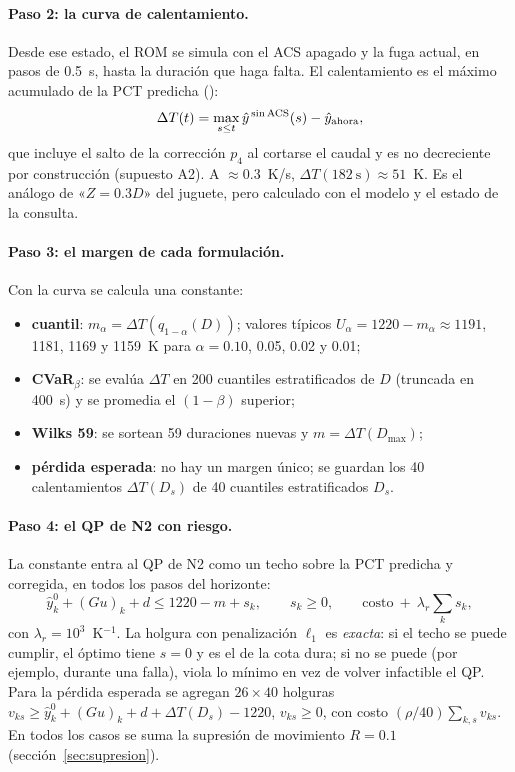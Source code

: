 \paragraph{Paso 2: la curva de calentamiento.} Desde ese estado, el ROM se simula con el ACS
apagado y la fuga actual, en pasos de 0.5~s, hasta la duración que haga falta. El calentamiento
es el máximo acumulado de la PCT predicha ():
\[
\Delta T(t)=\max_{s\le t}\hat y^{\,\rm sin\,ACS}(s)-\hat y_{\rm ahora},
\]
que incluye el salto de la corrección $p_4$ al cortarse el caudal y es no decreciente por
construcción (supuesto A2). A $\approx0.3$~K/s, $\Delta T(182~\text{s})\approx51$~K. Es el
análogo de «$Z=0.3D$» del juguete, pero calculado con el modelo y el estado de la consulta.

\paragraph{Paso 3: el margen de cada formulación.} Con la curva se calcula una constante:
\begin{itemize}
  \item \textbf{cuantil}: $m_\alpha=\Delta T(q_{1-\alpha}(D))$; valores típicos $U_\alpha=1220-m_\alpha
        \approx1191$, 1181, 1169 y 1159~K para $\alpha=0.10$, 0.05, 0.02 y 0.01;
  \item \textbf{CVaR$_\beta$}: se evalúa $\Delta T$ en 200 cuantiles estratificados de $D$
        (truncada en 400~s) y se promedia el $(1-\beta)$ superior;
  \item \textbf{Wilks 59}: se sortean 59 duraciones nuevas y $m=\Delta T(D_{\max})$;
  \item \textbf{pérdida esperada}: no hay un margen único; se guardan los 40 calentamientos
        $\Delta T(D_s)$ de 40 cuantiles estratificados $D_s$.
\end{itemize}

\paragraph{Paso 4: el QP de N2 con riesgo.} La constante entra al QP de N2 como un techo sobre la
PCT predicha y corregida, en todos los pasos del horizonte:
\[
\hat y^0_k+(Gu)_k+d\le1220-m+s_k,\qquad s_k\ge0,\qquad\text{costo}\ +\ \lambda_r\textstyle\sum_ks_k,
\]
con $\lambda_r=10^3$~K$^{-1}$. La holgura con penalización $\ell_1$ es \emph{exacta}: si el techo se
puede cumplir, el óptimo tiene $s=0$ y es el de la cota dura; si no se puede (por ejemplo, durante
una falla), viola lo mínimo en vez de volver infactible el QP. Para la pérdida esperada se agregan
$26\times40$ holguras $v_{ks}\ge\hat y^0_k+(Gu)_k+d+\Delta T(D_s)-1220$, $v_{ks}\ge0$, con costo
$(\rho/40)\sum_{k,s}v_{ks}$. En todos los casos se suma la supresión de movimiento $R=0.1$
(sección~\ref{sec:supresion}).

